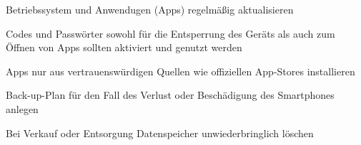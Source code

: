\item Betriebssystem und Anwendugen (Apps) regelmäßig aktualisieren
\item Codes und Passwörter sowohl für die Entsperrung des Geräts als auch zum Öffnen von Apps sollten aktiviert und genutzt werden
\item Apps nur aus vertrauenswürdigen Quellen wie offiziellen App-Stores installieren
\item Back-up-Plan für den Fall des Verlust oder Beschädigung des Smartphones anlegen
\item Bei Verkauf oder Entsorgung Datenspeicher unwiederbringlich löschen 